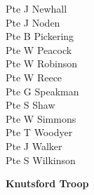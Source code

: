 \begin{multicols}{3}
  Pte J Newhall \\
  Pte J Noden \\
  Pte B Pickering \\
  Pte W Peacock \\
  Pte W Robinson \\
  Pte W Reece \\
  Pte G Speakman \\
  Pte S Shaw \\
  Pte W Simmons \\
  Pte T Woodyer \\
  Pte J Walker \\
  Pte S Wilkinson \\
\end{multicols}

\vspace*{10mm}

\begin{center}
  \Large
  \textbf{Knutsford Troop}
\end{center}

\vspace*{10mm}


